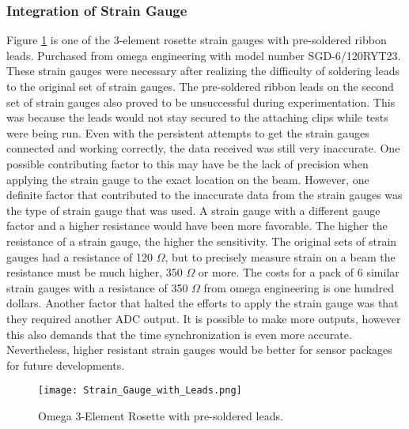 \subsubsection{Integration of Strain Gauge}

\indent Figure \ref{fig:OmegaSoldered} is one of the 3-element rosette strain gauges with pre-soldered ribbon leads. Purchased from omega engineering with
model number SGD-6/120RYT23. These strain gauges were necessary after realizing the difficulty of soldering leads to the original set of strain gauges. The
pre-soldered ribbon leads on the second set of strain gauges also proved to be unsuccessful during experimentation. This was because the leads would not
stay secured to the attaching clips while tests were being run. Even with the persistent attempts to get the strain gauges connected and working
correctly, the data received was still very inaccurate. One possible contributing factor to this may have be the lack of precision when applying the
strain gauge to the exact location on the beam. However, one definite factor that contributed to the inaccurate data from the strain gauges was the
type of strain gauge that was used. A strain gauge with a different gauge factor and a higher resistance would have been more favorable. The higher
the resistance of a strain gauge, the higher the sensitivity. The original sets of strain gauges had a resistance of 120 $\Omega$, but to precisely
measure strain on a beam the resistance must be much higher, 350 $\Omega$ or more. The costs for a pack of 6 similar strain gauges with a resistance of
350 $\Omega$ from omega engineering is one hundred dollars. Another factor that halted the efforts to apply the strain gauge was that they required
another ADC output. It is possible to make more outputs, however this also demands that the time synchronization is even more accurate.
Nevertheless, higher resistant strain gauges would be better for sensor packages for future developments. \\

\begin{figure}[h]
\centering
\texttt{[image: Strain\_Gauge\_with\_Leads.png]}
\caption{Omega 3-Element Rosette with pre-soldered leads.}
\label{fig:OmegaSoldered}
\end{figure}